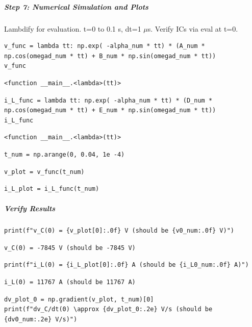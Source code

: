 \subparagraph{Step 7: Numerical Simulation and Plots}

Lambdify for evaluation. t=0 to 0.1 s, dt=1 $\mu$s. Verify ICs via eval at t=0.

\begin{verbatim}
v_func = lambda tt: np.exp( -alpha_num * tt) * (A_num * np.cos(omegad_num * tt) + B_num * np.sin(omegad_num * tt))
v_func
\end{verbatim}

\begin{verbatim}
<function __main__.<lambda>(tt)>
\end{verbatim}

\begin{verbatim}
i_L_func = lambda tt: np.exp( -alpha_num * tt) * (D_num * np.cos(omegad_num * tt) + E_num * np.sin(omegad_num * tt))
i_L_func
\end{verbatim}

\begin{verbatim}
<function __main__.<lambda>(tt)>
\end{verbatim}

\begin{verbatim}
t_num = np.arange(0, 0.04, 1e -4)
\end{verbatim}

\begin{verbatim}
v_plot = v_func(t_num)
\end{verbatim}

\begin{verbatim}
i_L_plot = i_L_func(t_num)
\end{verbatim}

\subparagraph{Verify Results}

\begin{verbatim}
print(f"v_C(0) = {v_plot[0]:.0f} V (should be {v0_num:.0f} V)")
\end{verbatim}

\begin{verbatim}
v_C(0) = -7845 V (should be -7845 V)
\end{verbatim}

\begin{verbatim}
print(f"i_L(0) = {i_L_plot[0]:.0f} A (should be {i_L0_num:.0f} A)")
\end{verbatim}

\begin{verbatim}
i_L(0) = 11767 A (should be 11767 A)
\end{verbatim}

\begin{verbatim}
dv_plot_0 = np.gradient(v_plot, t_num)[0]
print(f"dv_C/dt(0) \approx {dv_plot_0:.2e} V/s (should be {dv0_num:.2e} V/s)")
\end{verbatim}

